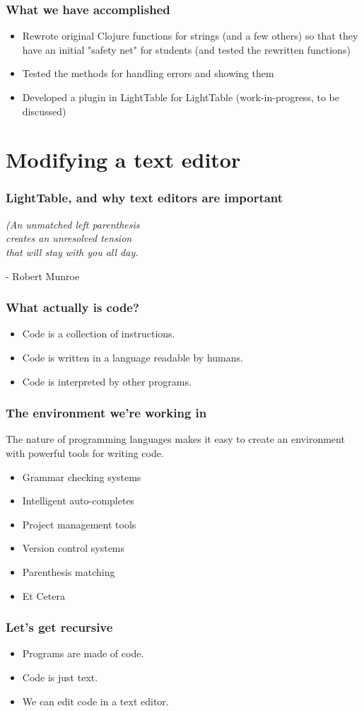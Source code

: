 \documentclass{beamer}
\newcommand{\comment}[1]{{\bf \tt  {#1}}}
\newcommand{\emcomment}[1]{\textcolor{ForestGreen}{\comment{Elena: {#1}}}}
\begin{document}
\begin{frame}[fragile]
\frametitle{What we have accomplished}
\begin{itemize}
\item Rewrote original Clojure functions for strings (and a few others) so that they have an initial "safety net" for students (and tested the rewritten functions)
\item Tested the methods for handling errors and showing them 
\item Developed a plugin in LightTable for LightTable (work-in-progress, to be discussed)
\end{itemize}
\end{frame}

\section{Modifying a text editor}

\begin{frame}
\frametitle{LightTable, and why text editors are important}
	\begin{center}
	{\em (An unmatched left parenthesis\\ creates an unresolved tension\\ that will stay with you all day.}	

	\vspace*{2\baselineskip}
	- Robert Munroe
	\end{center}
\end{frame}

\begin{frame}
\frametitle{What actually is code?}
	\begin{itemize}
	\item Code is a collection of instructions.
	\item Code is written in a language readable by humans.
	\item Code is interpreted by other programs.
	\end{itemize}
\end{frame}

\begin{frame}
\frametitle{The environment we're working in}
	The nature of programming languages makes it easy to create an environment with powerful tools for writing code.
	{\em
	\begin{itemize}
	\item Grammar checking systems
	\item Intelligent auto-completes
	\item Project management tools
	\item Version control systems
	\item Parenthesis matching
	\item Et Cetera
	\end{itemize}
	}
\end{frame}

\begin{frame}
\frametitle{Let's get recursive}
	\begin{itemize}
	\item Programs are made of code.
	\item Code is just text.
	\item We can edit code in a text editor.
	\end{itemize}
\end{frame} 
\end{document}
